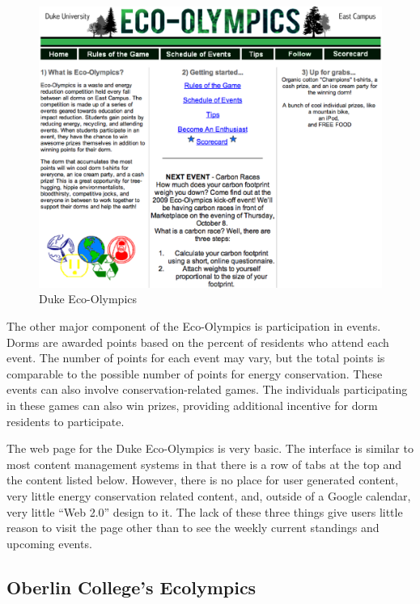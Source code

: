 \begin{figure}
	\centering
	\includegraphics[scale=0.25]{images/duke-ecolympics.eps}
	\caption{Duke Eco-Olympics}
\end{figure}

The other major component of the Eco-Olympics is participation in events.  Dorms are awarded points based on the percent of residents who attend each event.  The number of points for each event may vary, but the total points is comparable to the possible number of points for energy conservation.  These events can also involve conservation-related games.  The individuals participating in these games can also win prizes, providing additional incentive for dorm residents to participate.

The web page for the Duke Eco-Olympics is very basic.  The interface is similar to most content management systems in that there is a row of tabs at the top and the content listed below.  However, there is no place for user generated content, very little energy conservation related content, and, outside of a Google calendar, very little ``Web 2.0'' design to it.  The lack of these three things give users little reason to visit the page other than to see the weekly current standings and upcoming events.

\subsection{Oberlin College's Ecolympics}
\label{competitions-oberlin}

